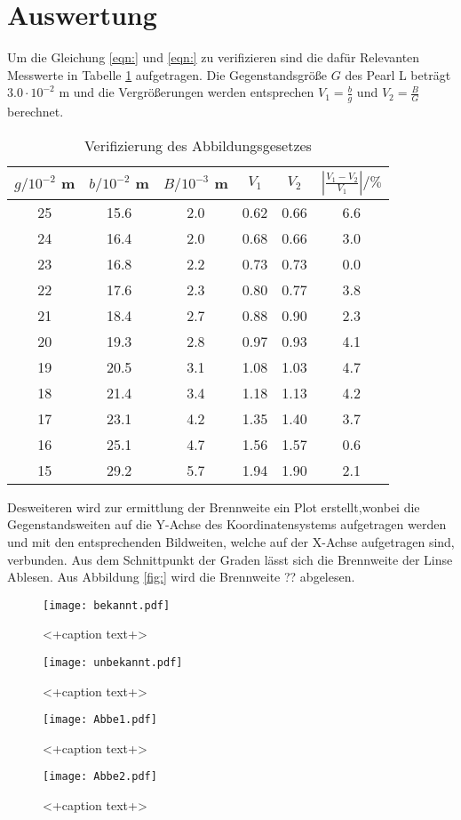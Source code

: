 \section{Auswertung}
\label{sec:Auswertung}
Um die Gleichung \ref{eqn:} und \ref{eqn:} zu verifizieren sind die dafür Relevanten Messwerte in Tabelle \ref{tab:VdA} aufgetragen. Die Gegenstandsgröße $G$ des Pearl L beträgt $3.0 \cdot 10^{-2}$ m und die Vergrößerungen werden entsprechen $V_1 = \frac{b}{g}$ und $V_2 = \frac{B}{G}$ berechnet.
\begin{table}
  \centering
  \begin{tabular}{c c c c c c}
    \toprule
    $g / 10^{-2}$ m & $b / 10^{-2}$ m & $B / 10^{-3}$ m & $V_1$ & $V_2$ & $\left\lvert \frac{V_1 - V_2}{V_1} \right\rvert / \% $\\
   \midrule
    25	& 15.6	& 2.0 	& 0.62 & 0.66	& 6.6 	\\
    24	& 16.4	& 2.0	& 0.68 & 0.66	& 3.0	\\
    23	& 16.8	& 2.2	& 0.73 & 0.73	& 0.0	\\
    22	& 17.6	& 2.3	& 0.80 & 0.77	& 3.8	\\
    21	& 18.4	& 2.7	& 0.88 & 0.90	& 2.3	\\
    20	& 19.3	& 2.8	& 0.97 & 0.93	& 4.1	\\
    19	& 20.5	& 3.1	& 1.08 & 1.03	& 4.7	\\
    18	& 21.4	& 3.4	& 1.18 & 1.13	& 4.2	\\
    17	& 23.1	& 4.2	& 1.35 & 1.40	& 3.7	\\
    16	& 25.1	& 4.7	& 1.56 & 1.57	& 0.6	\\
    15	& 29.2	& 5.7	& 1.94 & 1.90	& 2.1	\\
    \bottomrule
  \end{tabular}
  \caption{Verifizierung des Abbildungsgesetzes}
  \label{tab:VdA}
\end{table}
Desweiteren wird zur ermittlung der Brennweite ein Plot erstellt,wonbei die Gegenstandsweiten auf die Y-Achse des Koordinatensystems aufgetragen werden und mit den entsprechenden Bildweiten, welche auf der X-Achse aufgetragen sind, verbunden. Aus dem Schnittpunkt der Graden lässt sich die Brennweite der Linse Ablesen. Aus Abbildung \ref{fig:} wird die Brennweite ?? abgelesen. 
\begin{figure}
  \centering
  \texttt{[image: bekannt.pdf]}
  \caption{<+caption text+>}
  \label{fig:<+label+>}
\end{figure}

\begin{figure}
  \centering
  \texttt{[image: unbekannt.pdf]}
  \caption{<+caption text+>}
  \label{fig:<+label+>}
\end{figure}

\begin{figure}
  \centering
    \texttt{[image: Abbe1.pdf]}
  \caption{<+caption text+>}
  \label{fig:<+label+>}
\end{figure}

\begin{figure}
  \centering
  \texttt{[image: Abbe2.pdf]}
  \caption{<+caption text+>}
  \label{fig:<+label+>}
\end{figure}
